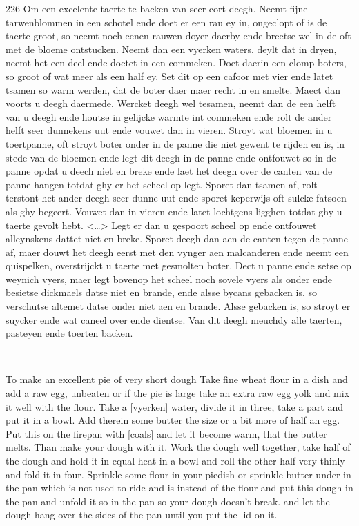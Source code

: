 \documentclass[a4paper]{article}
\begin{document}
\medskip
\begin{minipage}{.45\textwidth}
226 Om een excelente taerte te backen van seer cort deegh.
Neemt fijne tarwenblommen in een schotel ende doet er een rau ey in, ongeclopt of is de taerte groot, so neemt noch eenen rauwen doyer daerby ende breetse wel in de oft met de bloeme ontstucken. Neemt dan een vyerken waters, deylt dat in dryen, neemt het een deel ende doetet in een commeken. Doet daerin een clomp boters, so groot of wat meer als een half ey. Set dit op een cafoor met vier ende latet tsamen so warm werden, dat de boter daer maer recht in en smelte. Maect dan voorts u deegh daermede. Wercket deegh wel tesamen, neemt dan de een helft van u deegh ende houtse in gelijcke warmte int commeken ende rolt de ander helft seer dunnekens uut ende vouwet dan in vieren. Stroyt wat bloemen in u toertpanne, oft stroyt boter onder in de panne die niet gewent te rijden en is, in stede van de bloemen ende legt dit deegh in de panne ende ontfouwet so in de panne opdat u deech niet en breke ende laet het deegh over de canten van de panne hangen totdat ghy er het scheel op legt. Sporet dan tsamen af, rolt terstont het ander deegh seer dunne uut ende sporet keperwijs oft sulcke fatsoen als ghy begeert. Vouwet dan in vieren ende latet lochtgens ligghen totdat ghy u taerte gevolt hebt. <…>  Legt er dan u gespoort scheel op ende ontfouwet alleynskens dattet niet en breke. Sporet deegh dan aen de canten tegen de panne af, maer douwt het deegh eerst met den vynger aen malcanderen ende neemt een quispelken, overstrijckt u taerte met gesmolten boter. Dect u panne ende setse op weynich vyers, maer legt bovenop het scheel noch sovele vyers als onder ende besietse dickmaels datse niet en brande, ende alsse bycans gebacken is, so verschutse altemet datse onder niet aen en brande. Alsse gebacken is, so stroyt er suycker ende wat caneel over ende dientse. Van dit deegh meuchdy alle taerten, pasteyen ende toerten backen. \cite{cb}
\end{minipage}
\begin{minipage}{0.05\textwidth}
\ \ \ 
\end{minipage}
\begin{minipage}{.45\textwidth}
	To make an excellent pie of very short dough
Take fine wheat flour in a dish and add a raw egg, unbeaten or if the pie is large take an extra raw egg yolk and mix it well with the flour. Take a [vyerken] water, divide it in three, take a part and put it in a bowl. Add therein some butter the size or a bit more of half an egg. Put this on the firepan with [coals] and let it become warm, that the butter melts. Than make your dough with it. Work the dough well together, take half of the dough and hold it in equal heat in a bowl and roll the other half very thinly and fold it in four. Sprinkle some flour in your piedish or sprinkle butter under in the pan which is not used to ride and is instead of the flour and put this dough in the pan and unfold it so in the pan so your dough doesn't break. and let the dough hang over the sides of the pan until you put the lid on it.
\end{minipage}
\end{document}
